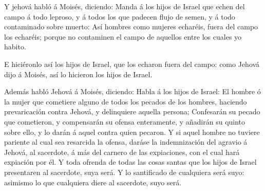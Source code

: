  Y jehová habló á Moisés, diciendo:  Manda á los
hijos de Israel que echen del campo á todo leproso, y á todos los que
padecen flujo de semen, y á todo contaminado sobre muerto: 
Así hombres como mujeres echaréis, fuera del campo los echaréis; porque
no contaminen el campo de aquellos entre los cuales yo habito.

 E hiciéronlo así los hijos de Israel, que los echaron fuera
del campo: como Jehová dijo á Moisés, así lo hicieron los hijos de
Israel.

 Además habló Jehová á Moisés, diciendo:  Habla
á los hijos de Israel: El hombre ó la mujer que cometiere alguno de
todos los pecados de los hombres, haciendo prevaricación contra Jehová,
y delinquiere aquella persona;  Confesarán su pecado que
cometieron, y compensarán su ofensa enteramente, y añadirán su quinto
sobre ello, y lo darán á aquel contra quien pecaron.  Y si
aquel hombre no tuviere pariente al cual sea resarcida la ofensa, daráse
la indemnización del agravio á Jehová, al sacerdote, á más del carnero
de las expiaciones, con el cual hará expiación por él.  Y
toda ofrenda de todas las cosas santas que los hijos de Israel
presentaren al sacerdote, suya será.  Y lo santificado de
cualquiera será suyo: asimismo lo que cualquiera diere al sacerdote,
suyo será.


